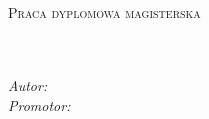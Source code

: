 \documentclass[
12pt, %
oneside, %
polish, %
onehalfspacing, %
headsepline, %
chapterinoneline, %
]{MastersDoctoralThesis} %
\author{inż Przemysław \textsc{Sałapata}} %
\begin{document}
\selectfont

% 
\pagestyle{plain} %

\begin{titlepage}
	\begin{center}
		
		\vspace*{.06\textheight}
		{\scshape\LARGE \univname\par}%


		\groupname\\\deptname\\[2cm] %
		 

		\textsc{\Large Praca dyplomowa magisterska}\\[0.5cm] %
		
		\HRule \\[0.4cm] %
		{\huge \bfseries \ttitle\par}\vspace{0.4cm} %
		\HRule \\[1.5cm] %
		
				\emph{Autor:}
				\href{mailto:przemyslaw.salapata1@gmail.com}{\authorname} %
		\\
				\emph{Promotor:}
				\href{mailto:krzysztof.budnik@put.poznan.pl}{\supname} %
		\\[3cm]




\end{center}
\end{titlepage}
\end{document}
